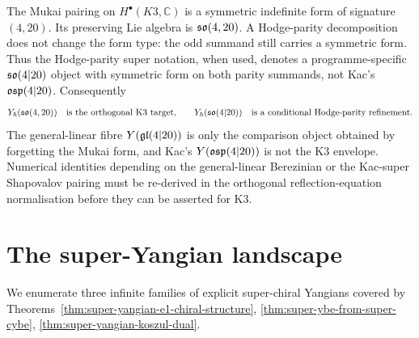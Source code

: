 \begin{remark}
\label{rem:vol-iii-osp-rename-caveat}
The Mukai pairing on $H^\bullet(K3,\mathbb{C})$ is a symmetric
indefinite form of signature $(4,20)$. Its preserving Lie algebra is
$\mathfrak{so}(4,20)$. A Hodge-parity decomposition does not change the form
type: the odd summand still carries a symmetric form. Thus the
Hodge-parity super notation, when used, denotes a programme-specific
$\mathfrak{so}(4|20)$ object with symmetric form on both parity summands, not
Kac's $\mathfrak{osp}(4|20)$. Consequently
\[
 Y_{\hbar}(\mathfrak{so}(4,20))
 \quad\text{is the orthogonal K3 target,}
 \qquad
 Y_{\hbar}(\mathfrak{so}(4|20))
 \quad\text{is a conditional Hodge-parity refinement.}
\]
The general-linear fibre $Y(\mathfrak{gl}(4|20))$ is only the comparison object
obtained by forgetting the Mukai form, and Kac's $Y(\mathfrak{osp}(4|20))$ is
not the K3 envelope. Numerical identities depending on the
general-linear Berezinian or the Kac-super Shapovalov pairing must be
re-derived in the orthogonal reflection-equation normalisation before
they can be asserted for K3.
\end{remark}

\section{The super-Yangian landscape}
\label{sec:super-landscape}

We enumerate three infinite families of explicit super-chiral Yangians
covered by Theorems~\ref{thm:super-yangian-e1-chiral-structure},
\ref{thm:super-ybe-from-super-cybe}, \ref{thm:super-yangian-koszul-dual}.

